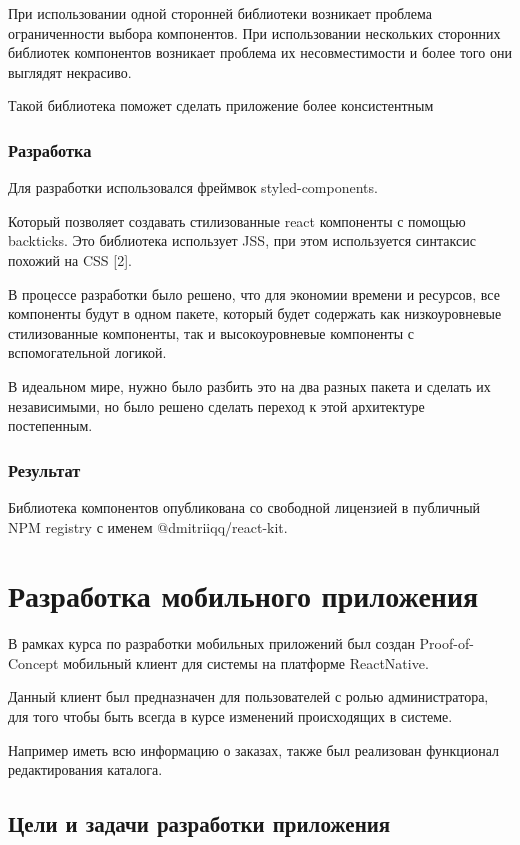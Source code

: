 \documentclass[a4paper,article,14pt]{extarticle}
\begin{document}
При использовании одной сторонней библиотеки возникает проблема ограниченности выбора компонентов.
При использовании нескольких сторонних библиотек компонентов возникает проблема их несовместимости и более того они выглядят некрасиво.

Такой библиотека поможет сделать приложение более консистентным

\subsubsection{Разработка}

Для разработки использовался фреймвок styled-components.

Который позволяет создавать стилизованные react компоненты с помощью backticks.
Это библиотека использует JSS, при этом используется синтаксис похожий на CSS [2].

В процессе разработки было решено, что для экономии времени и ресурсов, все компоненты будут в одном пакете,
который будет содержать как низкоуровневые стилизованные компоненты, так и высокоуровневые компоненты с
вспомогательной логикой.

В идеальном мире, нужно было разбить это на два разных пакета и сделать их независимыми, но 
было решено сделать переход к этой архитектуре постепенным.

\subsubsection{Результат}

Библиотека компонентов опубликована со свободной лицензией в публичный NPM registry с именем @dmitriiqq/react-kit.
\pagebreak

\section{Разработка мобильного приложения}

В рамках курса по разработки мобильных приложений был создан Proof-of-Concept мобильный клиент 
для системы на платформе ReactNative.

Данный клиент был предназначен для пользователей с ролью администратора, для того
чтобы быть всегда в курсе изменений происходящих в системе.

Например иметь всю информацию о заказах, также был реализован функционал редактирования каталога.

\subsection{Цели и задачи разработки приложения}
\end{document}

